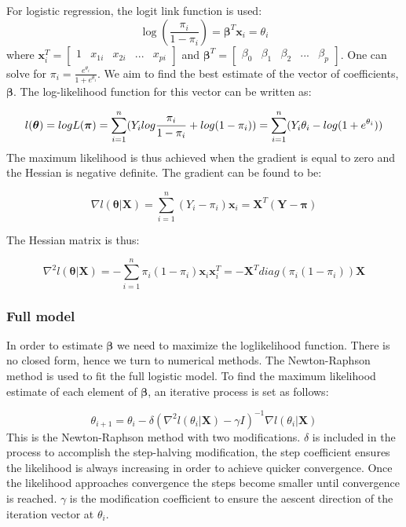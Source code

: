 \documentclass[]{article}
\begin{document}
For logistic regression, the logit link function is used:
\[\log(\frac{\pi_i}{1-\pi_i}) = \boldsymbol \beta ^T\boldsymbol x_i = \theta_i\]
where
\(\boldsymbol x_i^T = \begin{bmatrix} 1 & x_{1i} &x_{2i} & ... & x_{pi} \end{bmatrix}\)
and
\(\boldsymbol \beta^T = \begin{bmatrix} \beta_0 & \beta_1 & \beta_2 & ... & \beta_p \end{bmatrix}\).
One can solve for \(\pi_i = \frac{e^{\theta_i}}{1 + e^{\theta_i}}\). We
aim to find the best estimate of the vector of coefficients,
\(\boldsymbol \beta\). The log-likelihood function for this vector can
be written as:

\[l(\boldsymbol\theta)=logL(\boldsymbol\pi) =\sum_{i=1}^n(Y_ilog\frac{\pi_i}{1-\pi_i}+log(1-\pi_i)) = \sum_{i=1}^n(Y_i\theta_i - log(1 + e^{\mathbf \theta_i}))\\\]
The maximum likelihood is thus achieved when the gradient is equal to
zero and the Hessian is negative definite. The gradient can be found to
be:

\[\nabla l(\boldsymbol\theta|\boldsymbol X) = \sum_{i=1}^n (Y_i - \pi_i)\boldsymbol x_i = \boldsymbol X^T(\boldsymbol Y - \boldsymbol \pi) \]

The Hessian matrix is thus:

\[\nabla^2 l(\boldsymbol\theta|\boldsymbol X) = -\sum_{i=1}^n \pi_i(1 - \pi_i)\boldsymbol x_i\boldsymbol x_i^T = -\boldsymbol X^Tdiag(\pi_i(1 - \pi_i)) \boldsymbol X\]

\hypertarget{full-model}{%
\subsubsection{Full model}\label{full-model}}

In order to estimate \(\boldsymbol \beta\) we need to maximize the
loglikelihood function. There is no closed form, hence we turn to
numerical methods. The Newton-Raphson method is used to fit the full
logistic model. To find the maximum likelihood estimate of each element
of \(\boldsymbol \beta\), an iterative process is set as follows:

\[\theta_{i+1}  = \theta_{i} -\delta (\nabla^2l(\theta_{i}|\boldsymbol X)-\gamma I)^{-1}\nabla l(\theta_{i}|\boldsymbol X) \]
This is the Newton-Raphson method with two modifications. \(\delta\) is
included in the process to accomplish the step-halving modification, the
step coefficient ensures the likelihood is always increasing in order to
achieve quicker convergence. Once the likelihood approaches convergence
the steps become smaller until convergence is reached. \(\gamma\) is the
modification coefficient to ensure the aescent direction of the
iteration vector at \(\theta_{i}\).
\end{document}
